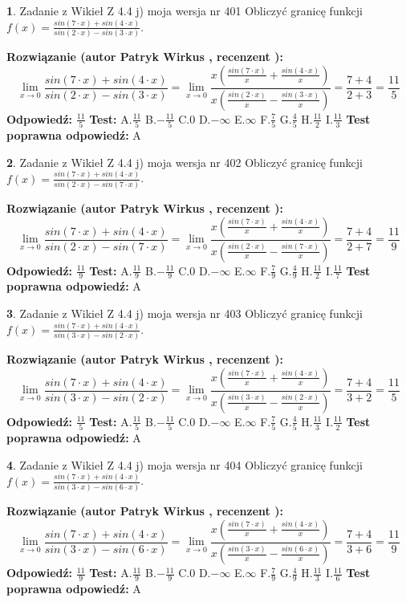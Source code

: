 \documentclass[12pt, a4paper]{article}
\theoremstyle{definition} %
\newtheorem{zad}{}
\newcommand{\zadStart}[1]{\begin{zad}#1\newline}
\newcommand{\zadStop}{\end{zad}}
\newcommand{\rozwStart}[2]{\noindent \textbf{Rozwiązanie (autor #1 , recenzent #2): }\newline}
\newcommand{\rozwStop}{\newline}
\newcommand{\odpStart}{\noindent \textbf{Odpowiedź:}\newline}
\newcommand{\odpStop}{\newline}
\newcommand{\testStart}{\noindent \textbf{Test:}\newline}
\newcommand{\testStop}{\newline}
\newcommand{\kluczStart}{\noindent \textbf{Test poprawna odpowiedź:}\newline}
\newcommand{\kluczStop}{\newline}
\begin{document}
\zadStart{Zadanie z Wikieł Z 4.4 j) moja wersja nr 401}
Obliczyć granicę funkcji $f(x)=\frac{sin(7\cdot x) +sin(4\cdot x)}{sin(2\cdot x) -sin(3\cdot x)}$.
\zadStop
\rozwStart{Patryk Wirkus}{}
$$\lim\limits_{x\to 0}\frac{sin(7\cdot x) +sin(4\cdot x)}{sin(2\cdot x) -sin(3\cdot x)}=\lim\limits_{x\to 0}\frac{x(\frac{sin(7\cdot x)}{x}+\frac{sin(4\cdot x)}{x})}{x(\frac{sin(2\cdot x)}{x}-\frac{sin(3\cdot x)}{x})}=\frac{7+4}{2+3} = \frac{11}{5}$$
\rozwStop
\odpStart
$\frac{11}{5}$
\odpStop
\testStart
A.$\frac{11}{5}$
B.$-\frac{11}{5}$
C.$0$
D.$-\infty$
E.$\infty$
F.$\frac{7}{5}$
G.$\frac{4}{5}$
H.$\frac{11}{2}$
I.$\frac{11}{3}$
\testStop
\kluczStart
A
\kluczStop



\zadStart{Zadanie z Wikieł Z 4.4 j) moja wersja nr 402}
Obliczyć granicę funkcji $f(x)=\frac{sin(7\cdot x) +sin(4\cdot x)}{sin(2\cdot x) -sin(7\cdot x)}$.
\zadStop
\rozwStart{Patryk Wirkus}{}
$$\lim\limits_{x\to 0}\frac{sin(7\cdot x) +sin(4\cdot x)}{sin(2\cdot x) -sin(7\cdot x)}=\lim\limits_{x\to 0}\frac{x(\frac{sin(7\cdot x)}{x}+\frac{sin(4\cdot x)}{x})}{x(\frac{sin(2\cdot x)}{x}-\frac{sin(7\cdot x)}{x})}=\frac{7+4}{2+7} = \frac{11}{9}$$
\rozwStop
\odpStart
$\frac{11}{9}$
\odpStop
\testStart
A.$\frac{11}{9}$
B.$-\frac{11}{9}$
C.$0$
D.$-\infty$
E.$\infty$
F.$\frac{7}{9}$
G.$\frac{4}{9}$
H.$\frac{11}{2}$
I.$\frac{11}{7}$
\testStop
\kluczStart
A
\kluczStop



\zadStart{Zadanie z Wikieł Z 4.4 j) moja wersja nr 403}
Obliczyć granicę funkcji $f(x)=\frac{sin(7\cdot x) +sin(4\cdot x)}{sin(3\cdot x) -sin(2\cdot x)}$.
\zadStop
\rozwStart{Patryk Wirkus}{}
$$\lim\limits_{x\to 0}\frac{sin(7\cdot x) +sin(4\cdot x)}{sin(3\cdot x) -sin(2\cdot x)}=\lim\limits_{x\to 0}\frac{x(\frac{sin(7\cdot x)}{x}+\frac{sin(4\cdot x)}{x})}{x(\frac{sin(3\cdot x)}{x}-\frac{sin(2\cdot x)}{x})}=\frac{7+4}{3+2} = \frac{11}{5}$$
\rozwStop
\odpStart
$\frac{11}{5}$
\odpStop
\testStart
A.$\frac{11}{5}$
B.$-\frac{11}{5}$
C.$0$
D.$-\infty$
E.$\infty$
F.$\frac{7}{5}$
G.$\frac{4}{5}$
H.$\frac{11}{3}$
I.$\frac{11}{2}$
\testStop
\kluczStart
A
\kluczStop



\zadStart{Zadanie z Wikieł Z 4.4 j) moja wersja nr 404}
Obliczyć granicę funkcji $f(x)=\frac{sin(7\cdot x) +sin(4\cdot x)}{sin(3\cdot x) -sin(6\cdot x)}$.
\zadStop
\rozwStart{Patryk Wirkus}{}
$$\lim\limits_{x\to 0}\frac{sin(7\cdot x) +sin(4\cdot x)}{sin(3\cdot x) -sin(6\cdot x)}=\lim\limits_{x\to 0}\frac{x(\frac{sin(7\cdot x)}{x}+\frac{sin(4\cdot x)}{x})}{x(\frac{sin(3\cdot x)}{x}-\frac{sin(6\cdot x)}{x})}=\frac{7+4}{3+6} = \frac{11}{9}$$
\rozwStop
\odpStart
$\frac{11}{9}$
\odpStop
\testStart
A.$\frac{11}{9}$
B.$-\frac{11}{9}$
C.$0$
D.$-\infty$
E.$\infty$
F.$\frac{7}{9}$
G.$\frac{4}{9}$
H.$\frac{11}{3}$
I.$\frac{11}{6}$
\testStop
\kluczStart
A
\kluczStop
\end{document}
